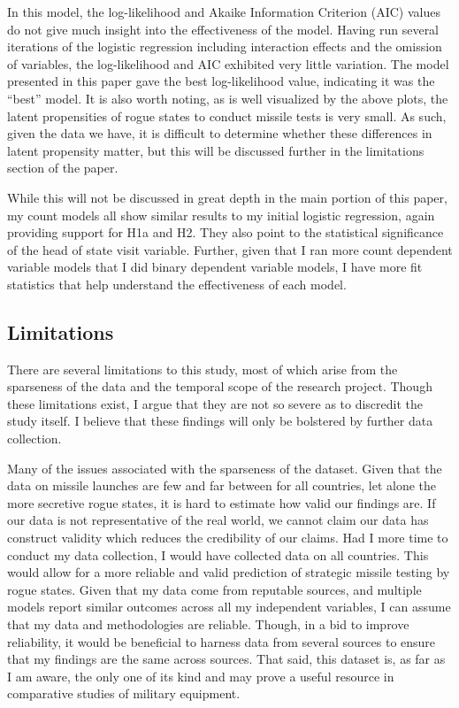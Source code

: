 \documentclass[12pt]{article}
\begin{document}
In this model, the log-likelihood and Akaike Information Criterion (AIC) values do not give much insight into the effectiveness of the model. Having run several iterations of the logistic regression including interaction effects and the omission of variables, the log-likelihood and AIC exhibited very little variation. The model presented in this paper gave the best log-likelihood value, indicating it was the “best” model. It is also worth noting, as is well visualized by the above plots, the latent propensities of rogue states to conduct missile tests is very small. As such, given the data we have, it is difficult to determine whether these differences in latent propensity matter, but this will be discussed further in the limitations section of the paper.

While this will not be discussed in great depth in the main portion of this paper, my count models all show similar results to my initial logistic regression, again providing support for H1a and H2. They also point to the statistical significance of the head of state visit variable. Further, given that I ran more count dependent variable models that I did binary dependent variable models, I have more fit statistics that help understand the effectiveness of each model.   

\subsection{Limitations}
There are several limitations to this study, most of which arise from the sparseness of the data and the temporal scope of the research project. Though these limitations exist, I argue that they are not so severe as to discredit the study itself. I believe that these findings will only be bolstered by further data collection.

Many of the issues associated with the sparseness of the dataset. Given that the data on missile launches are few and far between for all countries, let alone the more secretive rogue states, it is hard to estimate how valid our findings are. If our data is not representative of the real world, we cannot claim our data has construct validity which reduces the credibility of our claims. Had I more time to conduct my data collection, I would have collected data on all countries. This would allow for a more reliable and valid prediction of strategic missile testing by rogue states. Given that my data come from reputable sources, and multiple models report similar outcomes across all my independent variables, I can assume that my data and methodologies are reliable. Though, in a bid to improve reliability, it would be beneficial to harness data from several sources to ensure that my findings are the same across sources. That said, this dataset is, as far as I am aware, the only one of its kind and may prove a useful resource in comparative studies of military equipment.
\end{document}
